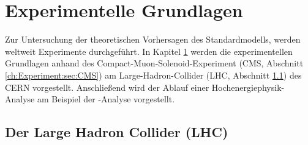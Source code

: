 \chapter{Experimentelle Grundlagen}
\label{ch:experiment}

{}	%

Zur Untersuchung der theoretischen Vorhersagen des Standardmodells, werden weltweit Experimente durchgef\"uhrt. In Kapitel \ref{ch:experiment} werden die experimentellen Grundlagen anhand des Compact-Muon-Solenoid-Experiment (CMS, Abschnitt \ref{ch:Experiment:sec:CMS}) am Large-Hadron-Collider (LHC, Abschnitt \ref{ch:Experiment:sec:LHC}) des CERN vorgestellt. Anschlie\ss end wird der Ablauf einer Hochenergiephysik-Analyse am Beispiel der \ttH-Analyse vorgestellt.

\section{Der Large Hadron Collider (LHC)}
\label{ch:Experiment:sec:LHC}

